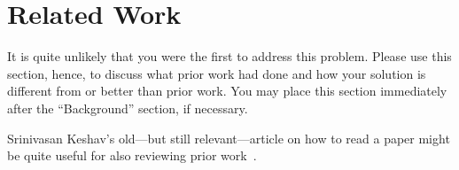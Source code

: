 \section{Related Work}\label{s:related}

It is quite unlikely that you were the first to address this problem. Please use
this section, hence, to discuss what prior work had done and how your solution
is different from or better than prior work. You may place this section
immediately after the “Background” section, if necessary.

Srinivasan Keshav's old---but still relevant---article on how to read a paper
might be quite useful for also reviewing prior work~\cite{Keshav-SIGCOMMCCR2007}.


